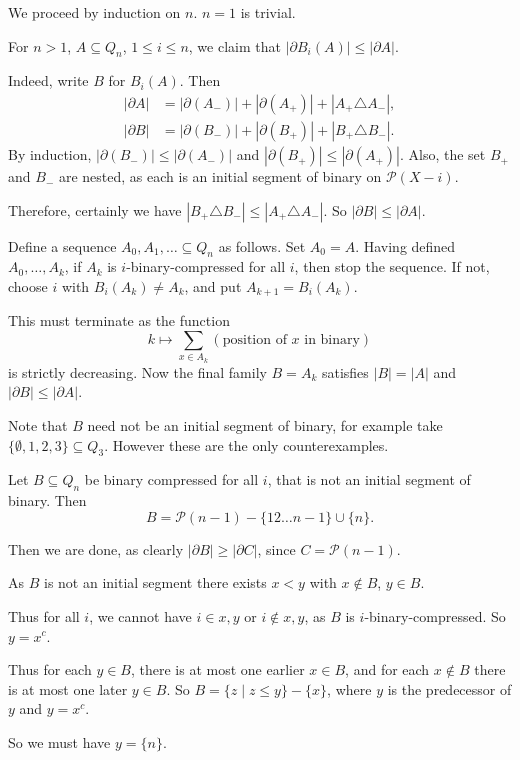 \documentclass[12pt]{article}
\begin{document}
\begin{proofbox}
	We proceed by induction on $n$. $n = 1$ is trivial.

	For $n > 1$, $A \subseteq Q_n$, $1 \leq i \leq n$, we claim that $|\partial B_i(A)| \leq |\partial A|$.

	Indeed, write $B$ for $B_i(A)$. Then
	\begin{align*}
		|\partial A| &= |\partial(A_-)| + |\partial(A_+)| + |A_+ \triangle A_-|, \\
		|\partial B| &= |\partial(B_-)| + |\partial(B_+)| + |B_+ \triangle B_-|.
	\end{align*}
	By induction, $|\partial(B_-)| \leq |\partial(A_-)|$ and $|\partial(B_+)| \leq |\partial(A_+)|$. Also, the set $B_+$ and $B_-$ are nested, as each is an initial segment of binary on $\mathcal{P}(X - i)$.

	Therefore, certainly we have $|B_+ \triangle B_-| \leq |A_+ \triangle A_-|$. So $|\partial B| \leq |\partial A|$.

	Define a sequence $A_0, A_1, \ldots \subseteq Q_n$ as follows. Set $A_0 = A$. Having defined $A_0, \ldots, A_k$, if $A_k$ is $i$-binary-compressed for all $i$, then stop the sequence. If not, choose $i$ with $B_i(A_k) \neq A_k$, and put $A_{k+1} = B_i(A_k)$.

	This must terminate as the function
	\[
		k \mapsto \sum_{x \in A_k} (\text{position of $x$ in binary})
	\]
	is strictly decreasing. Now the final family $B = A_k$ satisfies $|B| = |A|$ and $|\partial B| \leq |\partial A|$.
\end{proofbox}

Note that $B$ need not be an initial segment of binary, for example take $\{\emptyset, 1, 2, 3\} \subseteq Q_3$. However these are the only counterexamples.

\begin{lemma}
	Let $B \subseteq Q_n$ be binary compressed for all $i$, that is not an initial segment of binary. Then
	\[
		B = \mathcal{P}(n - 1) - \{12 \ldots n-1\} \cup \{n\}.
	\]
\end{lemma}

Then we are done, as clearly $|\partial B| \geq |\partial C|$, since $C = \mathcal{P}(n-1)$.

\begin{proofbox}
	As $B$ is not an initial segment there exists $x < y$ with $x \not \in B$, $y \in B$.

	Thus for all $i$, we cannot have $i \in x, y$ or $i \notin x, y$, as $B$ is $i$-binary-compressed. So $y = x^{c}$.

	Thus for each $y \in B$, there is at most one earlier $x \in B$, and for each $x \not \in B$ there is at most one later $y \in B$. So $B = \{z \mid z \leq y\} - \{x\}$, where $y$ is the predecessor of $y$ and $y = x^{c}$.

	So we must have $y = \{n\}$.
\end{proofbox}
\end{document}

